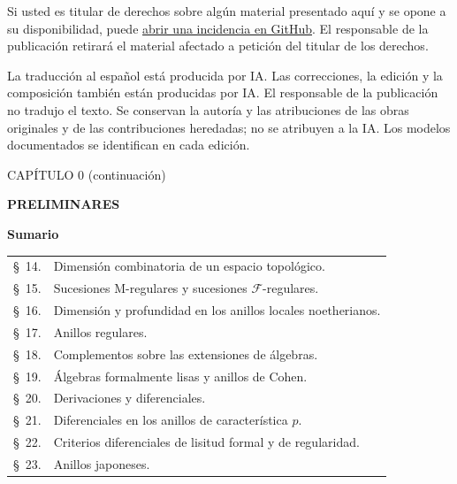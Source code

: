 \documentclass[10pt,oneside]{book}
\newcommand{\oldpage}[2][]{%
  \setcounter{footnote}{0}%
  \marginpar{\scriptsize\textbf{#1}~|~#2}\ignorespaces}
\begin{document}
Si usted es titular de derechos sobre algún material presentado aquí y se opone a su disponibilidad, puede \href{https://github.com/KokunoYumeto/ega-fga-es/issues}{abrir una incidencia en GitHub}. El responsable de la publicación retirará el material afectado a petición del titular de los derechos.

La traducción al español está producida por IA. Las correcciones, la edición y la composición también están producidas por IA. El responsable de la publicación no tradujo el texto. Se conservan la autoría y las atribuciones de las obras originales y de las contribuciones heredadas; no se atribuyen a la IA. Los modelos documentados se identifican en cada edición.
\par
\endgroup
\clearpage

\clearpage
\thispagestyle{plain}
\oldpage[IV-1]{5}
\label{chapter:0IV1-es}

\begin{center}
{\large CAPÍTULO 0 (continuación)\footnotemark\par}
\vspace{1.5em}
{\Large\bfseries PRELIMINARES\par}
\vspace{2em}
{\large\bfseries Sumario\par}
\end{center}


\begin{center}
\begin{tabular}{@{}r l@{}}
\S~14. & Dimensión combinatoria de un espacio topológico.\\
\S~15. & Sucesiones M-regulares y sucesiones $\mathscr F$-regulares.\\
\S~16. & Dimensión y profundidad en los anillos locales noetherianos.\\
\S~17. & Anillos regulares.\\
\S~18. & Complementos sobre las extensiones de álgebras.\\
\S~19. & Álgebras formalmente lisas y anillos de Cohen.\\
\S~20. & Derivaciones y diferenciales.\\
\S~21. & Diferenciales en los anillos de característica $p$.\\
\S~22. & Criterios diferenciales de lisitud formal y de regularidad.\\
\S~23. & Anillos japoneses.
\end{tabular}
\end{center}
\end{document}
